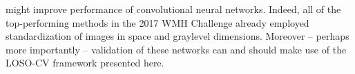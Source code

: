 might improve performance of convolutional neural networks.
Indeed, all of the top-performing methods in the 2017 WMH Challenge
already employed standardization of images in space and graylevel dimensions.
Moreover -- perhaps more importantly -- validation of these networks
can and should make use of the LOSO-CV framework presented here.
